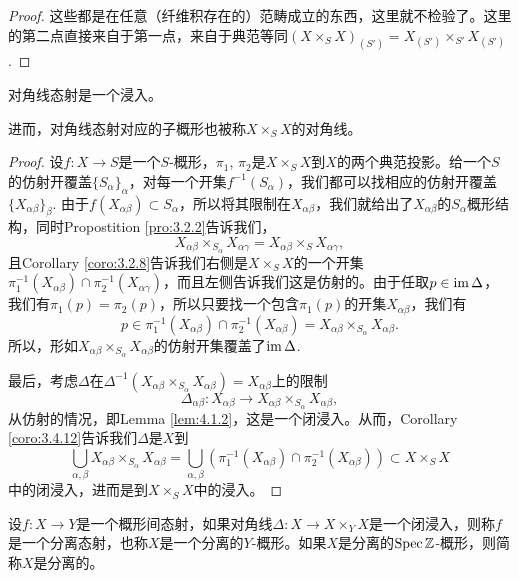 \begin{proof}
这些都是在任意（纤维积存在的）范畴成立的东西，这里就不检验了。这里的第二点直接来自于第一点，来自于典范等同$(X\times_S X)_{(S')}=X_{(S')}\times_{S'}X_{(S')}$.
\end{proof}

\begin{lem}
	对角线态射是一个浸入。
\end{lem}

进而，对角线态射对应的子概形也被称$X\times_S X$的对角线。

\begin{proof}
设$f:X\to S$是一个$S$-概形，$\pi_1$, $\pi_2$是$X\times_S X$到$X$的两个典范投影。给一个$S$的仿射开覆盖$\{S_\alpha\}_\alpha$，对每一个开集$f^{-1}(S_\alpha)$，我们都可以找相应的仿射开覆盖$\{X_{\alpha\beta}\}_\beta$. 由于$f(X_{\alpha\beta})\subset S_{\alpha}$，所以将其限制在$X_{\alpha\beta}$，我们就给出了$X_{\alpha\beta}$的$S_\alpha$概形结构，同时Propostition \ref{pro:3.2.2}告诉我们，
\[
	X_{\alpha\beta}\times_{S_\alpha}X_{\alpha\gamma}=X_{\alpha\beta}\times_{S}X_{\alpha\gamma},
\]
且Corollary \ref{coro:3.2.8}告诉我们右侧是$X\times_S X$的一个开集
$\pi_1^{-1}(X_{\alpha\beta})\cap \pi_2^{-1}(X_{\alpha\gamma})$，而且左侧告诉我们这是仿射的。由于任取$p\in \operatorname{im} \Delta$，我们有$\pi_1(p)=\pi_2(p)$，所以只要找一个包含$\pi_1(p)$的开集$X_{\alpha\beta}$，我们有
\[
p\in \pi_1^{-1}(X_{\alpha\beta})\cap \pi_2^{-1}(X_{\alpha\beta})=X_{\alpha\beta}\times_{S_\alpha}X_{\alpha\beta}.
\]
所以，形如$X_{\alpha\beta}\times_{S_\alpha}X_{\alpha\beta}$的仿射开集覆盖了$\operatorname{im} \Delta$. 

最后，考虑$\Delta$在$\Delta^{-1}(X_{\alpha\beta}\times_{S_\alpha}X_{\alpha\beta})=X_{\alpha\beta}$上的限制
\[
	\Delta_{\alpha\beta}:X_{\alpha\beta}\to X_{\alpha\beta}\times_{S_\alpha}X_{\alpha\beta},
\]
从仿射的情况，即Lemma \ref{lem:4.1.2}，这是一个闭浸入。从而，Corollary \ref{coro:3.4.12}告诉我们$\Delta$是$X$到
\[
\bigcup_{\alpha,\beta}X_{\alpha\beta}\times_{S_\alpha}X_{\alpha\beta}=\bigcup_{\alpha,\beta}\left(\pi_1^{-1}(X_{\alpha\beta})\cap \pi_2^{-1}(X_{\alpha\beta})\right)\subset X\times_S X
\]
中的闭浸入，进而是到$X\times_S X$中的浸入。
\end{proof}

\begin{para}[分离性]
	设$f:X\to Y$是一个概形间态射，如果对角线$\Delta:X\to X\times_Y X$是一个闭浸入，则称$f$是一个分离态射，也称$X$是一个分离的$Y$-概形。如果$X$是分离的$\operatorname{Spec} \mathbb{Z}$-概形，则简称$X$是分离的。
\end{para}

